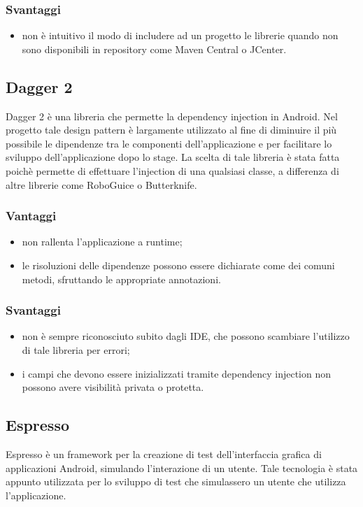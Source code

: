 \documentclass[../Tesi.tex]{subfiles}
\begin{document}
		\subsubsection{Svantaggi}
			\begin{itemize}
				\item non è intuitivo il modo di includere ad un progetto le librerie quando non sono disponibili in repository come Maven Central o JCenter.
			\end{itemize}

	\subsection{Dagger 2}
		Dagger 2 è una libreria che permette la dependency injection in Android. Nel progetto tale design pattern è largamente utilizzato al fine di diminuire il più possibile le dipendenze tra le componenti dell'applicazione e per facilitare lo sviluppo dell'applicazione dopo lo stage. La scelta di tale libreria è stata fatta poichè permette di effettuare l'injection di una qualsiasi classe, a differenza di altre librerie come RoboGuice o Butterknife.
		\subsubsection{Vantaggi}
			\begin{itemize}
				\item non rallenta l'applicazione a runtime;
				\item le risoluzioni delle dipendenze possono essere dichiarate come dei comuni metodi, sfruttando le appropriate annotazioni.
			\end{itemize}
		\subsubsection{Svantaggi}
			\begin{itemize}
				\item non è sempre riconosciuto subito dagli IDE, che possono scambiare l'utilizzo di tale libreria per errori;
				\item i campi che devono essere inizializzati tramite dependency injection non possono avere visibilità privata o protetta.
			\end{itemize}

	\subsection{Espresso}
		Espresso è un framework per la creazione di test dell'interfaccia grafica di applicazioni Android, simulando l'interazione di un utente. Tale tecnologia è stata appunto utilizzata per lo sviluppo di test che simulassero un utente che utilizza l'applicazione.
\end{document}
